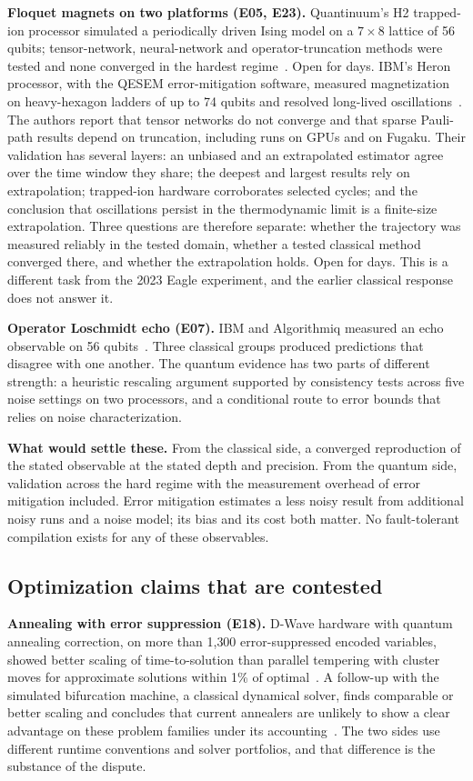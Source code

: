 \documentclass[10pt,a4paper]{article}
\begin{document}
\textbf{Floquet magnets on two platforms (E05, E23).} Quantinuum's H2 trapped-ion processor simulated a periodically driven Ising model on a $7\times8$ lattice of 56 qubits; tensor-network, neural-network and operator-truncation methods were tested and none converged in the hardest regime~\cite{haghshenas2025}. Open for  days. IBM's Heron processor, with the QESEM error-mitigation software, measured magnetization on heavy-hexagon ladders of up to 74 qubits and resolved long-lived oscillations~\cite{leviatan2026}. The authors report that tensor networks do not converge and that sparse Pauli-path results depend on truncation, including runs on GPUs and on Fugaku. Their validation has several layers: an unbiased and an extrapolated estimator agree over the time window they share; the deepest and largest results rely on extrapolation; trapped-ion hardware corroborates selected cycles; and the conclusion that oscillations persist in the thermodynamic limit is a finite-size extrapolation. Three questions are therefore separate: whether the trajectory was measured reliably in the tested domain, whether a tested classical method converged there, and whether the extrapolation holds. Open for  days. This is a different task from the 2023 Eagle experiment, and the earlier classical response does not answer it.

\textbf{Operator Loschmidt echo (E07).} IBM and Algorithmiq measured an echo observable on 56 qubits~\cite{barron2026,ibmalgo2026}. Three classical groups produced predictions that disagree with one another. The quantum evidence has two parts of different strength: a heuristic rescaling argument supported by consistency tests across five noise settings on two processors, and a conditional route to error bounds that relies on noise characterization.

\textbf{What would settle these.} From the classical side, a converged reproduction of the stated observable at the stated depth and precision. From the quantum side, validation across the hard regime with the measurement overhead of error mitigation included. Error mitigation estimates a less noisy result from additional noisy runs and a noise model; its bias and its cost both matter. No fault-tolerant compilation exists for any of these observables.

\subsection{Optimization claims that are contested}
\textbf{Annealing with error suppression (E18).} D-Wave hardware with quantum annealing correction, on more than 1{,}300 error-suppressed encoded variables, showed better scaling of time-to-solution than parallel tempering with cluster moves for approximate solutions within 1\% of optimal~\cite{munoz2025,dwave_qac}. A follow-up with the simulated bifurcation machine, a classical dynamical solver, finds comparable or better scaling and concludes that current annealers are unlikely to show a clear advantage on these problem families under its accounting~\cite{pawlowski2026}. The two sides use different runtime conventions and solver portfolios, and that difference is the substance of the dispute.
\end{document}
